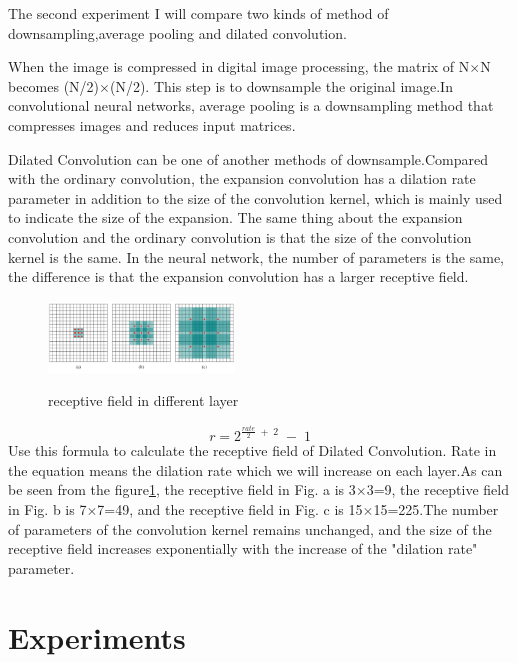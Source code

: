 \documentclass{article}
\begin{document}
The second experiment I will compare two kinds of method of downsampling,average pooling and dilated convolution.

When the image is compressed in digital image processing, the matrix of N$\times$N becomes (N/2)$\times$(N/2). This step is to downsample the original image.In convolutional neural networks, average pooling is a downsampling method that compresses images and reduces input matrices.

Dilated Convolution can be one of another methods of downsample.Compared with the ordinary convolution, the expansion convolution has a dilation rate parameter in addition to the size of the convolution kernel, which is mainly used to indicate the size of the expansion. The same thing about the expansion convolution and the ordinary convolution is that the size of the convolution kernel is the same. In the neural network, the number of parameters is the same, the difference is that the expansion convolution has a larger receptive field\cite{DBLP:journals/corr/YuK15}.
\begin{figure}[H] %
	\centering %
	\includegraphics[width=0.44\textwidth]{./pic/part2/kongdongjuanji.png} %
	\caption{receptive field in different layer} %
	\label{Fig.main2} %
	\cite{DBLP:journals/corr/YuK15}
\end{figure}

\begin{equation}
r=2^{\frac{rate}2\;+\;2}\;-\;1
\end{equation}
Use this formula to calculate the receptive field of Dilated Convolution. Rate in the equation means the dilation rate which we will increase  on each layer.As can be seen from the figure\ref{Fig.main2}, the receptive field in Fig. a is 3$\times$3=9, the receptive field in Fig. b is 7$\times$7=49, and the receptive field in Fig. c is 15$\times$15=225.The number of parameters of the convolution kernel remains unchanged, and the size of the receptive field increases exponentially with the increase of the "dilation rate" parameter.


\section{Experiments}
\end{document}
